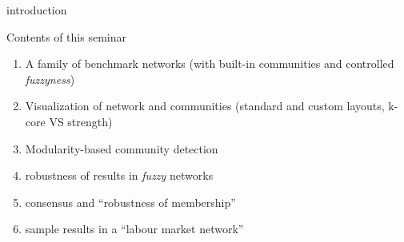 \documentclass[
  ignorenonframetext,
]{beamer}
\begin{document}
\begin{frame}{introduction}
\begin{block}{Contents of this seminar}
\protect\hypertarget{contents-of-this-seminar}{}
\begin{enumerate}
\item
  A family of benchmark networks (with built-in communities and
  controlled \emph{fuzzyness})
\item
  Visualization of network and communities (standard and custom layouts,
  k-core VS strength)
\item
  Modularity-based community detection
\item
  robustness of results in \emph{fuzzy} networks
\item
  consensus and ``robustness of membership''
\item
  sample results in a ``labour market network''
\end{enumerate}
\end{block}
\end{frame}
\end{document}
